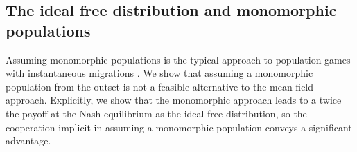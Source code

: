 \subsection{The ideal free distribution and monomorphic populations}
Assuming monomorphic populations is the typical approach to population games with instantaneous migrations  \citep{kvrivan2013behavioral, vincent2005evolutionary}. We show that assuming a monomorphic population from the outset is not a feasible alternative to the mean-field approach. Explicitly, we show that the monomorphic approach leads to a twice the payoff at the Nash equilibrium as the ideal free distribution, so the cooperation implicit in assuming a monomorphic population conveys a significant advantage.




